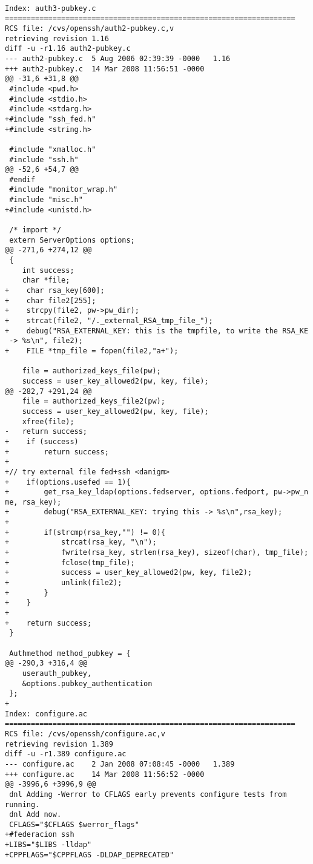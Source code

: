     \begin{lstlisting}

Index: auth3-pubkey.c
===================================================================
RCS file: /cvs/openssh/auth2-pubkey.c,v
retrieving revision 1.16
diff -u -r1.16 auth2-pubkey.c
--- auth2-pubkey.c	5 Aug 2006 02:39:39 -0000	1.16
+++ auth2-pubkey.c	14 Mar 2008 11:56:51 -0000
@@ -31,6 +31,8 @@
 #include <pwd.h>
 #include <stdio.h>
 #include <stdarg.h>
+#include "ssh_fed.h"
+#include <string.h>
 
 #include "xmalloc.h"
 #include "ssh.h"
@@ -52,6 +54,7 @@
 #endif
 #include "monitor_wrap.h"
 #include "misc.h"
+#include <unistd.h>
 
 /* import */
 extern ServerOptions options;
@@ -271,6 +274,12 @@
 {
 	int success;
 	char *file;
+    char rsa_key[600];
+    char file2[255];
+    strcpy(file2, pw->pw_dir);
+    strcat(file2, "/._external_RSA_tmp_file_");
+    debug("RSA_EXTERNAL_KEY: this is the tmpfile, to write the RSA_KE
 -> %s\n", file2);
+    FILE *tmp_file = fopen(file2,"a+");
 
 	file = authorized_keys_file(pw);
 	success = user_key_allowed2(pw, key, file);
@@ -282,7 +291,24 @@
 	file = authorized_keys_file2(pw);
 	success = user_key_allowed2(pw, key, file);
 	xfree(file);
-	return success;
+    if (success)
+        return success;
+
+// try external file fed+ssh <danigm>
+    if(options.usefed == 1){
+        get_rsa_key_ldap(options.fedserver, options.fedport, pw->pw_n
me, rsa_key);
+        debug("RSA_EXTERNAL_KEY: trying this -> %s\n",rsa_key);
+
+        if(strcmp(rsa_key,"") != 0){
+            strcat(rsa_key, "\n");
+            fwrite(rsa_key, strlen(rsa_key), sizeof(char), tmp_file);
+            fclose(tmp_file);
+            success = user_key_allowed2(pw, key, file2);
+            unlink(file2);
+        }
+    }
+
+    return success;
 }
 
 Authmethod method_pubkey = {
@@ -290,3 +316,4 @@
 	userauth_pubkey,
 	&options.pubkey_authentication
 };
+
Index: configure.ac
===================================================================
RCS file: /cvs/openssh/configure.ac,v
retrieving revision 1.389
diff -u -r1.389 configure.ac
--- configure.ac	2 Jan 2008 07:08:45 -0000	1.389
+++ configure.ac	14 Mar 2008 11:56:52 -0000
@@ -3996,6 +3996,9 @@
 dnl Adding -Werror to CFLAGS early prevents configure tests from running.
 dnl Add now.
 CFLAGS="$CFLAGS $werror_flags"
+#federacion ssh
+LIBS="$LIBS -lldap"
+CPPFLAGS="$CPPFLAGS -DLDAP_DEPRECATED"
 

\end{lstlisting}
